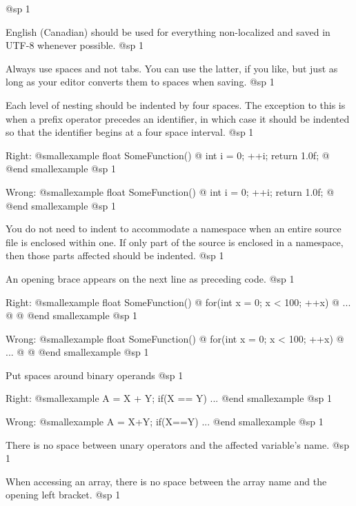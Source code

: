 @sp 1

\itemize

\item
English (Canadian) should be used for everything non-localized and saved in UTF-8 whenever possible.
@sp 1

\item
Always use spaces and not tabs. You can use the latter, if you like, but just as long as your editor converts them to spaces when saving.
@sp 1

\item
Each level of nesting should be indented by four spaces. The exception to this is when a prefix operator precedes an identifier, in which case it should be indented so that the identifier begins at a four space interval.
@sp 1

Right:
@smallexample
float SomeFunction()
@{
    int i = 0;
  ++i;
    return 1.0f;
@}
@end smallexample
@sp 1

Wrong:
@smallexample
float SomeFunction()
@{
    int i = 0;
    ++i;
        return 1.0f;
@}
@end smallexample
@sp 1

\item
You do not need to indent to accommodate a namespace when an entire source file is enclosed within one. If only part of the source is enclosed in a namespace, then those parts affected should be indented.
@sp 1

\item
An opening brace appears on the next line as preceding code.
@sp 1

Right:
@smallexample
float SomeFunction()
@{
    for(int x = 0; x < 100; ++x)
    @{
        ...
    @}
@}
@end smallexample
@sp 1

Wrong:
@smallexample
float SomeFunction() @{
    for(int x = 0; x < 100; ++x) @{
        ...
    @}
@}
@end smallexample
@sp 1

\item
Put spaces around binary operands
@sp 1

Right:
@smallexample
A = X + Y;
if(X == Y)
    ...
@end smallexample
@sp 1

Wrong:
@smallexample
A = X+Y;
if(X==Y)
    ...
@end smallexample
@sp 1

\item
There is no space between unary operators and the affected variable's name.
@sp 1

\item
When accessing an array, there is no space between the array name and the opening left bracket. 
@sp 1

